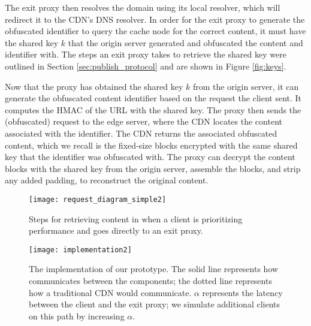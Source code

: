 The exit proxy then resolves the domain using its local resolver, which will redirect it to the CDN's DNS resolver. In order for the exit proxy to 
generate the obfuscated identifier to query the cache node for the correct content, 
it must have the shared key $k$ that the origin server generated and obfuscated the content and identifier 
with.  The steps an exit proxy takes to retrieve the shared key were outlined in Section \ref{sec:publish_protocol} and are shown in Figure \ref{fig:keys}.

Now that the proxy has obtained the shared key $k$ from the origin server, it can generate the obfuscated content identifier based 
on the request the client sent.  It computes the HMAC of the URL with the shared key.  The proxy then 
sends the (obfuscated) request to the edge server, where the CDN locates the content associated with the identifier.  The CDN returns 
the associated obfuscated content, which we recall is the fixed-size blocks encrypted with the same shared key that the identifier was 
obfuscated with.  The proxy can decrypt the content blocks with the shared key from the origin server, assemble the blocks, and strip any 
added padding, to reconstruct the original content.


\begin{figure}[t]

\begin{minipage}[c]{.5\linewidth}
\centering
\texttt{[image: request\_diagram\_simple2]}
\caption{Steps for retrieving content in \system{} when a client is prioritizing 
performance and goes directly to an exit proxy.}
\label{fig:retrieving}
\end{minipage}
\hfill
\begin{minipage}[c]{.45\linewidth}
\centering
\texttt{[image: implementation2]}
\caption{The implementation of our \system{} prototype.  The solid line represents
how \system{} communicates between the components; the dotted line represents how 
a traditional CDN would communicate. $\alpha$ represents the latency between the client 
and the exit proxy; we simulate additional clients on this path by increasing $\alpha$.}
\label{fig:impl}
\end{minipage}
\end{figure}

